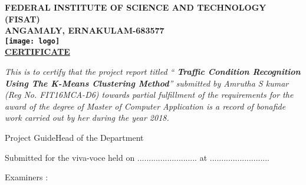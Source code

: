 \documentclass[12pt,report]{ucdavisthesis}
\begin{document}
    \thispagestyle{empty}
    \begin{center}
        \normalsize \bfseries{FEDERAL INSTITUTE OF SCIENCE AND TECHNOLOGY (FISAT)}\\
        \small \bfseries{ANGAMALY, ERNAKULAM-683577 }\\[0.5cm]
        \texttt{[image: logo]}\\[0.5 cm]
        \underline{\textbf{CERTIFICATE}}
    \end{center}
    \vspace{1 cm}
    \textit{This is to certify that the project report titled `` \textbf{Traffic Condition Recognition Using The
    		 K-Means Clustering Method}'' submitted by Amrutha S kumar (Reg No. FIT16MCA-D6) towards partial fulfillment of the requirements for the award of the degree of Master of Computer Application is a record of bonafide work carried out by her during the year 2018.\\[.6cm]}
   	\begin{minipage}{\textwidth}
   		\vspace{1cm}
   		\begin{flushleft} 
   			Project Guide\hspace*{7cm}Head of the Department \vspace{.5cm}
   		\end{flushleft}
   		\vspace{1cm}
   		Submitted for the viva-voce held on .......................... at .......................... 
   		
   		\vspace{1cm}
   		Examiners :
   		
   		
   		
   	\end{minipage}
    \vfill
    \newpage
   
    \clearpage
    \normalsize{}
   
\end{document}

